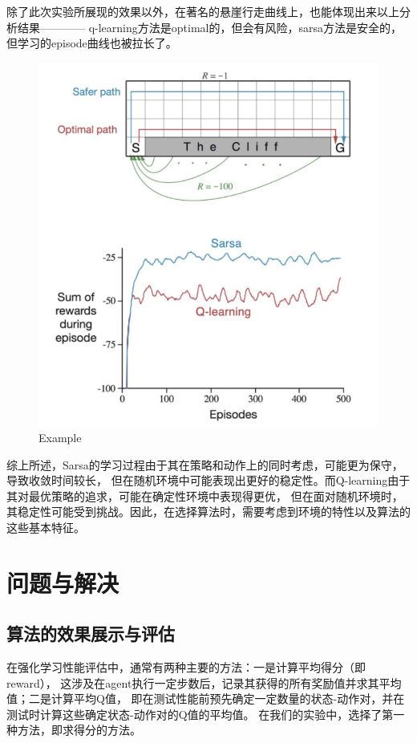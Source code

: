 \documentclass{thuemp}
\begin{document}
除了此次实验所展现的效果以外，在著名的悬崖行走曲线上，也能体现出来以上分析结果\cite{Ruoyu}————
q-learning方法是optimal的，但会有风险，sarsa方法是安全的，但学习的episode曲线也被拉长了。
\begin{figure}[H]
  \centering
  \includegraphics[width=1\linewidth]{./img/example.png}
  \caption{Example}
\end{figure}

综上所述，Sarsa的学习过程由于其在策略和动作上的同时考虑，可能更为保守，导致收敛时间较长，
但在随机环境中可能表现出更好的稳定性。而Q-learning由于其对最优策略的追求，可能在确定性环境中表现得更优，
但在面对随机环境时，其稳定性可能受到挑战。因此，在选择算法时，需要考虑到环境的特性以及算法的这些基本特征。\\
\vbox{}

\section{问题与解决}
\subsection{算法的效果展示与评估}
在强化学习性能评估中，通常有两种主要的方法：一是计算平均得分（即reward），
这涉及在agent执行一定步数后，记录其获得的所有奖励值并求其平均值；二是计算平均Q值，
即在测试性能前预先确定一定数量的状态-动作对，并在测试时计算这些确定状态-动作对的Q值的平均值。
在我们的实验中，选择了第一种方法，即求得分的方法。
\end{document}

